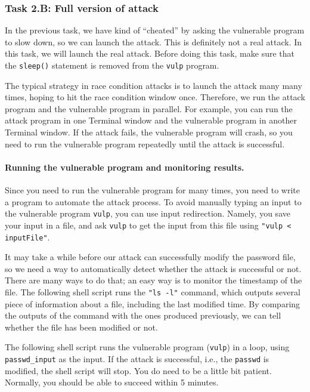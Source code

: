 \subsubsection{Task 2.B: Full version of attack}

In the previous task, we have kind of ``cheated'' by asking the vulnerable program
to slow down, so we can launch the attack. This is definitely not a real attack.
In this task, we will launch the real attack. 
Before doing this task, make sure that the \texttt{sleep()} statement is removed 
from the \texttt{vulp} program. 

The typical strategy in race condition attacks is to launch the attack many many 
times, hoping to hit the race condition window once.  
Therefore, we run the attack program and the vulnerable program in
parallel. For example, you can run the attack program in one Terminal
window and the vulnerable program in another Terminal window. 
If the attack fails, the vulnerable program will crash, so you need to run the
vulnerable program repeatedly until the attack is successful. 

\paragraph{Running the vulnerable program and monitoring results.}
Since you need to run the vulnerable program for many
times, you need to write a program to automate the attack process. 
To avoid manually typing an input to the vulnerable program \texttt{vulp}, you can use 
input redirection. Namely, you save your input in a file, and ask
\texttt{vulp} to get the input from this file using \texttt{"vulp <
inputFile"}.

It may take a while before our attack can successfully modify the
password file, so we need a way to automatically detect whether the attack is
successful or not. There are many ways to do that; an easy way 
is to monitor the timestamp of the file.
The following shell script runs the \texttt{"ls -l"} command, which
outputs several piece of information about a
file, including the last modified time. By comparing the outputs of the
command with the ones produced previously, we can tell
whether the file has been modified or not. 


The following shell script runs the vulnerable program (\texttt{vulp}) in a loop,
using \texttt{passwd\_input} as the input. If the attack is successful, i.e.,
the \texttt{passwd} is modified, the shell script will stop. 
You do need to be a little bit patient. 
Normally, you should be able to succeed within 5 minutes. 



